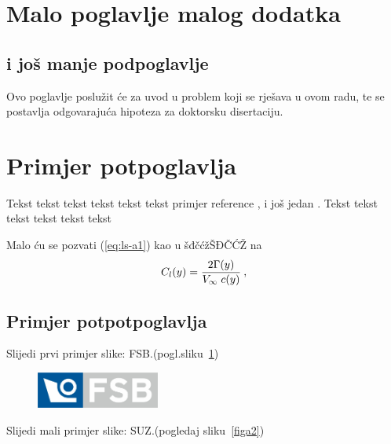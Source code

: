 \documentclass[a4paper,12pt]{report}
\def\Vinf{\hbox{$V_{\infty}$}} %
\begin{document}
\section{Malo poglavlje malog dodatka}
\subsection{i još manje podpoglavlje}
Ovo poglavlje poslu\v{z}it \'{c}e za uvod u problem koji se rje\v{s}ava u ovom
radu, te se postavlja odgovaraju\'{c}a hipoteza za doktorsku
disertaciju.

\section{Primjer potpoglavlja}
Tekst tekst tekst tekst tekst tekst primjer reference
\cite{mastersthesis-minimal}, i jo\v{s} jedan \cite{inbook-full}.
Tekst tekst tekst tekst tekst tekst 

Malo ću se pozvati (\eqref{eq:ls-a1}) kao u šđčćžŠĐČĆŽ na 
\begin{equation}\label{eq:ls-a1}
	C_l(y)=\frac{2\Gamma(y)}{\Vinf\;c(y)}\:,
\end{equation}
%

\subsection{Primjer potpotpoglavlja}

Slijedi prvi primjer slike: FSB.(pogl.sliku~\ref{figa1})
%

\begin{figure}[h]
  \centering
  \includegraphics[height=1.2cm]{fsb_logo_n}\\
  \label{figa1}
\end{figure}

\clearpage
Slijedi mali primjer slike: SUZ.(pogledaj sliku~\ref{figa2})
%
\end{document}
